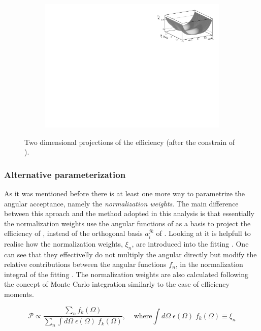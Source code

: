 \begin{figure}[h]
\begin{subfigure}{0.5\textwidth}
    \includegraphics[width=\textwidth]{Figures/Chapter4/canv_cosThL_phi_Sim08_3fb_hel_negKaons_all.pdf}
    \caption{}
    \label{eff2D_lp}
  \end{subfigure}
\caption{Two dimensional projections of the efficiency (after the constrain of ).}
\end{figure}


\subsubsection{Alternative parameterization}
As it was mentioned before there is at least one more way to parametrize the angular acceptance, namely the \emph{normalization weights}.
The main difference between this aproach and the method adopted in this analysis is that essentially the normalization weights use the angular functions
of  as a basis to project the efficiency of , instead of the orthogonal basis $a_i^{jk}$ of .
Looking at  it is helpfull to realise how the normalization weights, $\xi_n$, are introduced into the fitting \pdf. 
One can see that they effectivelly do not multiply the angular \pdf directly but modify the relative contributions between the angular functions
$f_n$, in the normalization integral of the fitting \pdf. The normalization weights are also calculated following the concept of Monte Carlo integration
similarly to the case of efficiency moments.

\begin{equation}
  \mathcal{P} \propto \frac{\sum_n f_k(\Omega)}{\sum_n \int d\Omega \; \epsilon(\Omega) \; f_k(\Omega)}, \;\;\;\;\text{where} \int d\Omega \; \epsilon(\Omega) \; f_k(\Omega) \equiv \xi_n 
  \label{norm_weights_pdf}
\end{equation}

